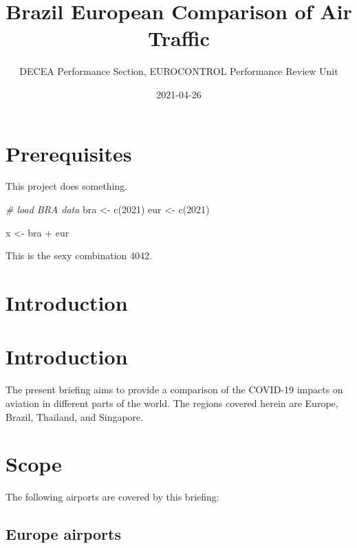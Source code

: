 \documentclass[
]{book}
\title{Brazil European Comparison of Air Traffic}
\author{DECEA Performance Section, EUROCONTROL Performance Review Unit}
\date{2021-04-26}
\newenvironment{Shaded}{\begin{snugshade}}{\end{snugshade}}
\newcommand{\CommentTok}[1]{\textcolor[rgb]{0.56,0.35,0.01}{\textit{#1}}}
\newcommand{\DecValTok}[1]{\textcolor[rgb]{0.00,0.00,0.81}{#1}}
\newcommand{\FunctionTok}[1]{\textcolor[rgb]{0.00,0.00,0.00}{#1}}
\newcommand{\NormalTok}[1]{#1}
\newcommand{\OtherTok}[1]{\textcolor[rgb]{0.56,0.35,0.01}{#1}}
\newcommand{\SpecialCharTok}[1]{\textcolor[rgb]{0.00,0.00,0.00}{#1}}
\begin{document}
\maketitle

{
\setcounter{tocdepth}{1}
\tableofcontents
}
\hypertarget{prerequisites}{%
\chapter{Prerequisites}\label{prerequisites}}

This project does something.

\begin{Shaded}
\begin{Highlighting}[]
\CommentTok{\# load BRA data}
\NormalTok{bra }\OtherTok{\textless{}{-}} \FunctionTok{c}\NormalTok{(}\DecValTok{2021}\NormalTok{)}
\NormalTok{eur }\OtherTok{\textless{}{-}} \FunctionTok{c}\NormalTok{(}\DecValTok{2021}\NormalTok{)}

\NormalTok{x }\OtherTok{\textless{}{-}}\NormalTok{ bra }\SpecialCharTok{+}\NormalTok{ eur}
\end{Highlighting}
\end{Shaded}

This is the sexy combination 4042.

\hypertarget{intro}{%
\chapter{Introduction}\label{intro}}

\hypertarget{introduction}{%
\chapter{Introduction}\label{introduction}}

The present briefing aims to provide a comparison of the COVID-19 impacts on aviation in different parts of the world. The regions covered herein are Europe, Brazil, Thailand, and Singapore.

\hypertarget{scope}{%
\chapter{Scope}\label{scope}}

The following airports are covered by this briefing:

\hypertarget{europe-airports}{%
\section{Europe airports}\label{europe-airports}}
\end{document}
